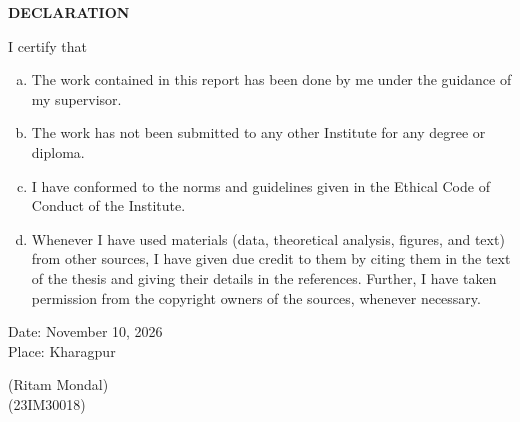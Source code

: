 \documentclass[10pt,a4paper]{report}
\numberwithin{algorithm}{chapter}
\begin{document}
\setcounter{page}{1}

\newpage
\thispagestyle{plain}
\begin{center}
\vspace*{0.8cm}
{\large\bfseries DECLARATION\par}
\end{center}
\vspace{0.8cm}
\noindent I certify that
\vspace{0.3cm}
\begin{enumerate}[(a)]
  \setlength{\itemsep}{10pt}
  \item The work contained in this report has been done by me under the guidance of my supervisor.
  \item The work has not been submitted to any other Institute for any degree or diploma.
  \item I have conformed to the norms and guidelines given in the Ethical Code of Conduct of the Institute.
  \item Whenever I have used materials (data, theoretical analysis, figures, and text) from other sources, I have given due credit to them by citing them in the text of the thesis and giving their details in the references. Further, I have taken permission from the copyright owners of the sources, whenever necessary.
\end{enumerate}

\vspace{3.0cm}
\noindent
\begin{minipage}[t]{0.5\textwidth}
Date: November 10, 2026\\[4pt]
Place: Kharagpur
\end{minipage}
\hfill
\begin{minipage}[t]{0.45\textwidth}
\raggedleft
(Ritam Mondal)\\[4pt]
(23IM30018)
\end{minipage}
\end{document}
